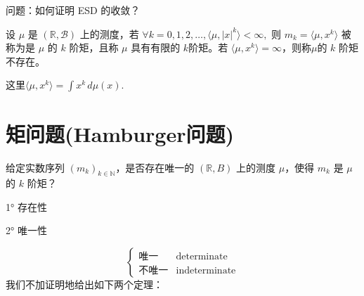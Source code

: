 \theoremstyle{plain}\newtheorem*{1}{习题1}
\theoremstyle{plain}\newtheorem*{2}{习题2}
\theoremstyle{plain}\newtheorem*{3}{习题3}
\theoremstyle{plain}\newtheorem*{4}{习题4}
\theoremstyle{plain}\newtheorem*{5}{习题5}
\theoremstyle{plain}\newtheorem*{6}{习题6}
\theoremstyle{plain}\newtheorem*{7}{习题7}
\theoremstyle{plain}\newtheorem*{8}{习题8}
\theoremstyle{plain}\newtheorem*{9}{习题9}
\theoremstyle{plain}\newtheorem*{10}{习题10}
\def\E{\mathbb{E}}
\def\R{\mathbb{R}}
\def\N{\mathbb{N}}
\def\B{\mathcal{B}}
\def\M{\mathcal{M}}
\def\prob{\mathbb{P}}
\def\t{\underline{t}}
\def\c{\underline{c}}
\newtheorem{prop}{性质}

问题：如何证明 ESD 的收敛？

\begin{definition}
    设 \(\mu\) 是 \((\mathbb{R}, \B)\) 上的测度，若 \(\forall k = 0, 1, 2, \ldots,\langle\mu,|x|^k\rangle < \infty,\)
则 \(m_k = \langle \mu,x^k\rangle\) 被称为是 \(\mu\) 的 \(k\) 阶矩，且称 \(\mu\) 具有有限的 \(k\)阶矩。若 \(\langle \mu,x^k\rangle = \infty\)，则称$\mu$的 \(k\) 阶矩不存在。

这里$\langle \mu,x^k\rangle=\int x^k \, d\mu(x)$.
\end{definition}

\section{矩问题(Hamburger问题)}

给定实数序列 \((m_k)_{k \in \mathbb{N}}\)，是否存在唯一的 \((\mathbb{R}, B)\) 上的测度 \(\mu\)，使得 \(m_k\) 是 \(\mu\) 的 \(k\) 阶矩？

1° 存在性

2° 唯一性

\begin{equation*}
\begin{cases} 
\text{唯一} & \text{determinate} \\
\text{不唯一} & \text{indeterminate}
\end{cases}
\end{equation*}
我们不加证明地给出如下两个定理：


